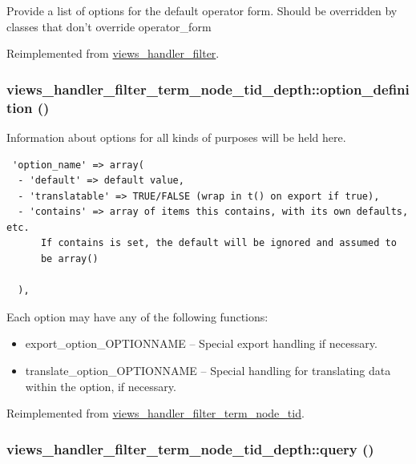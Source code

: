 Provide a list of options for the default operator form. Should be overridden by classes that don't override operator\_\-form 

Reimplemented from \hyperlink{classviews__handler__filter_cbd69b92e9199530a54069c79368db7f}{views\_\-handler\_\-filter}.\hypertarget{classviews__handler__filter__term__node__tid__depth_e0822209bc155abaec93555bbeb93e78}{
\subsubsection[{option\_\-definition}]{\setlength{\rightskip}{0pt plus 5cm}views\_\-handler\_\-filter\_\-term\_\-node\_\-tid\_\-depth::option\_\-definition ()}}
\label{classviews__handler__filter__term__node__tid__depth_e0822209bc155abaec93555bbeb93e78}


Information about options for all kinds of purposes will be held here. 

\begin{Code}\begin{verbatim} 'option_name' => array(
  - 'default' => default value,
  - 'translatable' => TRUE/FALSE (wrap in t() on export if true),
  - 'contains' => array of items this contains, with its own defaults, etc.
      If contains is set, the default will be ignored and assumed to
      be array()

  ),
\end{verbatim}
\end{Code}

 Each option may have any of the following functions:\begin{itemize}
\item export\_\-option\_\-OPTIONNAME -- Special export handling if necessary.\item translate\_\-option\_\-OPTIONNAME -- Special handling for translating data within the option, if necessary. \end{itemize}


Reimplemented from \hyperlink{classviews__handler__filter__term__node__tid_e81fb582295a2c8871b32bbf8b3ea915}{views\_\-handler\_\-filter\_\-term\_\-node\_\-tid}.\hypertarget{classviews__handler__filter__term__node__tid__depth_ff1d2c0057597790a56bffd0674f391a}{
\subsubsection[{query}]{\setlength{\rightskip}{0pt plus 5cm}views\_\-handler\_\-filter\_\-term\_\-node\_\-tid\_\-depth::query ()}}
\label{classviews__handler__filter__term__node__tid__depth_ff1d2c0057597790a56bffd0674f391a}


